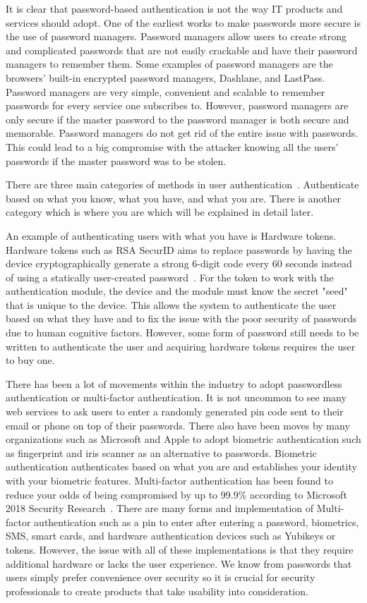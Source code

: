 \documentclass[letterpaper,twocolumn,10pt]{article}
\begin{document}
It is clear that password-based authentication is not the way IT products and services should adopt. One of the earliest works to make passwords more secure is the use of password managers. Password managers allow users to create strong and complicated passwords that are not easily crackable and have their password managers to remember them. Some examples of password managers are the browsers' built-in encrypted password managers, Dashlane, and LastPass. Password managers are very simple, convenient and scalable to remember passwords for every service one subscribes to. However, password managers are only secure if the master password to the password manager is both secure and memorable. Password managers do not get rid of the entire issue with passwords. This could lead to a big compromise with the attacker knowing all the users' passwords if the master password was to be stolen.

There are three main categories of methods in user authentication~\cite{book_security}. Authenticate based on what you know, what you have, and what you are. There is another category which is where you are which will be explained in detail later.

An example of authenticating users with what you have is Hardware tokens. Hardware tokens such as RSA SecurID aims to replace passwords by having the device cryptographically generate a strong 6-digit code every 60 seconds instead of using a statically user-created password~\cite{ieee_replace_passwords}. For the token to work with the authentication module, the device and the module must know the secret "seed" that is unique to the device. This allows the system to authenticate the user based on what they have and to fix the issue with the poor security of passwords due to human cognitive factors. However, some form of password still needs to be written to authenticate the user and acquiring hardware tokens requires the user to buy one.

There has been a lot of movements within the industry to adopt passwordless authentication or multi-factor authentication. It is not uncommon to see many web services to ask users to enter a randomly generated pin code sent to their email or phone on top of their passwords. There also have been moves by many organizations such as Microsoft and Apple to adopt biometric authentication such as fingerprint and iris scanner as an alternative to passwords. Biometric authentication authenticates based on what you are and establishes your identity with your biometric features. Multi-factor authentication has been found to reduce your odds of being compromised by up to 99.9\% according to Microsoft 2018 Security Research~\cite{microsoft}. There are many forms and implementation of Multi-factor authentication such as a pin to enter after entering a password, biometrics, SMS, smart cards, and hardware authentication devices such as Yubikeys or tokens. However, the issue with all of these implementations is that they require additional hardware or lacks the user experience. We know from passwords that users simply prefer convenience over security so it is crucial for security professionals to create products that take usability into consideration. 
\end{document}
